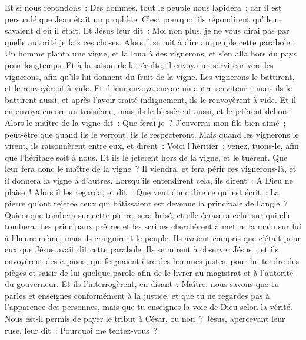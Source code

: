 \begin{multicols}{2}
Et si nous répondons~: Des hommes, tout le peuple nous lapidera~; car il est persuadé que Jean était un prophète.
C'est pourquoi ils répondirent qu'ils ne savaient d'où il était.
Et Jésus leur dit~: Moi non plus, je ne vous dirai pas par quelle autorité je fais ces choses.
Alors il se mit à dire au peuple cette parabole~: Un homme planta une vigne, et la loua à des vignerons, et s'en alla hors du pays pour longtemps.
Et à la saison de la récolte, il envoya un serviteur vers les vignerons, afin qu'ils lui donnent du fruit de la vigne. Les vignerons le battirent, et le renvoyèrent à vide.
Et il leur envoya encore un autre serviteur~; mais ils le battirent aussi, et après l'avoir traité indignement, ils le renvoyèrent à vide.
Et il en envoya encore un troisième, mais ils le blessèrent aussi, et le jetèrent dehors.
Alors le maître de la vigne dit~: Que ferai-je~? J'enverrai mon fils bien-aimé~; peut-être que quand ils le verront, ils le respecteront.
Mais quand les vignerons le virent, ils raisonnèrent entre eux, et dirent~: Voici l'héritier~; venez, tuons-le, afin que l'héritage soit à nous.
Et ils le jetèrent hors de la vigne, et le tuèrent. Que leur fera donc le maître de la vigne~?
Il viendra, et fera périr ces vignerons-là, et il donnera la vigne à d'autres. Lorsqu'ils entendirent cela, ils dirent~: A Dieu ne plaise~!
Alors il les regarda, et dit~: Que veut donc dire ce qui est écrit~: La pierre qu'ont rejetée ceux qui bâtissaient est devenue la principale de l'angle~?
Quiconque tombera sur cette pierre, sera brisé, et elle écrasera celui sur qui elle tombera.
Les principaux prêtres et les scribes cherchèrent à mettre la main sur lui à l'heure même, mais ils craignirent le peuple. Ils avaient compris que c'était pour eux que Jésus avait dit cette parabole.
Ils se mirent à observer Jésus~; et ils envoyèrent des espions, qui feignaient être des hommes justes, pour lui tendre des pièges et saisir de lui quelque parole afin de le livrer au magistrat et à l'autorité du gouverneur.
Et ils l'interrogèrent, en disant~: Maître, nous savons que tu parles et enseignes conformément à la justice, et que tu ne regardes pas à l'apparence des personnes, mais que tu enseignes la voie de Dieu selon la vérité.
Nous est-il permis de payer le tribut à César, ou non~?
Jésus, apercevant leur ruse, leur dit~: Pourquoi me tentez-vous~?

\end{multicols}
